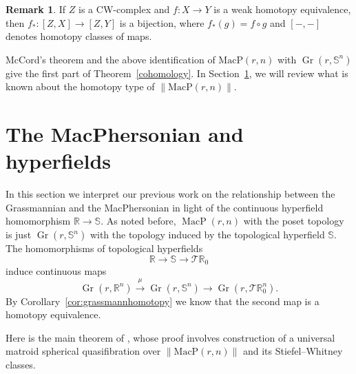 \documentclass[10pt, preprint]{article}
\theoremstyle{definition}
\newtheorem{remark}[theorem]{Remark}
\begin{document}
\begin{remark}
\label{mccordremark}
If $Z$ is a CW-complex and $f : X \to Y$ is a weak homotopy equivalence,
then $f_{*} : [Z,X] \to [Z,Y]$ is a bijection, where $f_{*}(g) = f
\circ g$ and $[-,-]$ denotes homotopy classes of maps.
\end{remark}

McCord's theorem and the above identification of $\mathrm{MacP}(r,n)$
with $\operatorname{Gr}(r,\mathbb{S}^{n})$ give the first part of
Theorem~\ref{cohomology}. In Section~\ref{sec:macphersonian}, we will
review what is known about the homotopy type of $\|\mathrm{MacP}(r,n)
\|$.

\section{The MacPhersonian and hyperfields}%
\label{sec:macphersonian}

In this section we interpret our previous work
\cite{Anderson-Davis} on the relationship between the Grassmannian and
the MacPhersonian in light of the continuous hyperfield homomorphism
$\mathbb{R}\to \mathbb{S}$. As noted before, $\operatorname{MacP}(r,n)$
with the poset topology is just $\operatorname{Gr}(r,\mathbb{S}^{n})$
with the topology induced by the topological hyperfield $\mathbb{S}$.
The homomorphisms of topological hyperfields
%
\begin{equation*}
\mathbb{R}\to \mathbb{S}\to \mathcal{T }\mathbb{R}_{0}
\end{equation*}
%
induce continuous maps
%
\begin{equation*}
\operatorname{Gr}(r,\mathbb{R}^{n}) \xrightarrow{\mu }
\operatorname{Gr}(r,\mathbb{S}^{n}) \to \operatorname{Gr}(r,\mathcal{T
}\mathbb{R}_{0}^{n}).
\end{equation*}
%
By Corollary~\ref{cor:grassmannhomotopy} we know that the second map is
a homotopy equivalence.

Here is the main theorem of \cite{Anderson-Davis}, whose proof
involves construction of a universal matroid spherical quasifibration
over $\|\mathrm{MacP}(r,n)\|$ and its Stiefel--Whitney classes.
\end{document}
